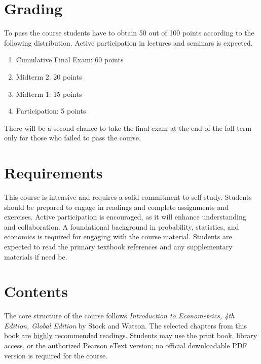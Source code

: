 \documentclass[12pt]{article}
\begin{document}
\section*{Grading}
To pass the course students have to obtain 50 out of 100 points according to the following distribution. Active participation in lectures and seminars is expected.
\begin{enumerate}
    \setlength{\itemsep}{0pt}
    \item Cumulative Final Exam: 60 points
    \item Midterm 2: 20 points
    \item Midterm 1: 15 points
    \item Participation: 5 points
\end{enumerate}

There will be a second chance to take the final exam at the end of the fall term only for those who failed to pass the course.


\section*{Requirements}
This course is intensive and requires a solid commitment to self-study. Students should be prepared to engage in readings and complete assignments and exercises. Active participation is encouraged, as it will enhance understanding and collaboration. A foundational background in probability, statistics, and economics is required for engaging with the course material. Students are expected to read the primary textbook references and any supplementary materials if need be.

\section*{Contents}

The core structure of the course follows \textit{Introduction to Econometrics, 4th Edition, Global Edition} by Stock and Watson. The selected chapters from this book are \underline{highly} recommended readings. Students may use the print book, library access, or the authorized Pearson eText version; no official downloadable PDF version is required for the course.
\end{document}
